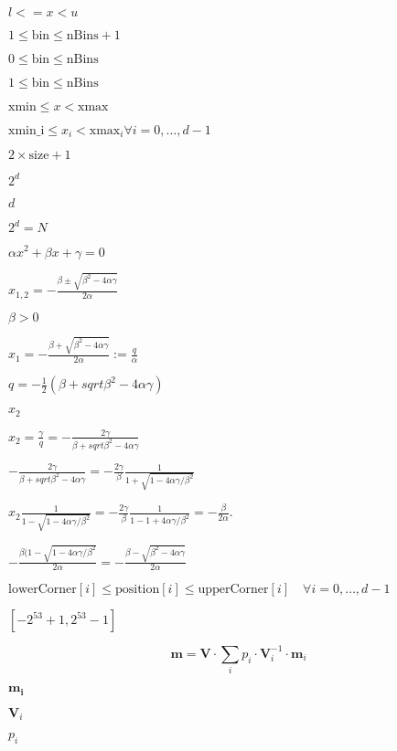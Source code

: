 \documentclass{article}
\begin{document}
$l <= x < u$
\pagebreak

$1 \le \text{bin} \le \text{nBins} + 1$
\pagebreak

$0 \le \text{bin} \le \text{nBins}$
\pagebreak

$1 \le \text{bin} \le \text{nBins}$
\pagebreak

$\text{xmin} \le x < \text{xmax}$
\pagebreak

$\text{xmin_i} \le x_i < \text{xmax}_i \forall i=0, \dots, d-1$
\pagebreak

$2 \times \text{size}+1$
\pagebreak

$2^d$
\pagebreak

$d$
\pagebreak

$2^d = N $
\pagebreak

$ \alpha x^{2} + \beta x + \gamma = 0 $
\pagebreak

$ x_{1, 2} = - \frac{\beta \pm \sqrt{\beta^{2}-4\alpha\gamma}}{2\alpha}$
\pagebreak

$ \beta > 0 $
\pagebreak

$ x_{1} = - \frac{\beta + \sqrt{\beta^{2}-4\alpha\gamma}}{2\alpha} := \frac{q}{\alpha}$
\pagebreak

$ q= -\frac{1}{2}(\beta+sqrt{\beta^{2}-4\alpha\gamma})$
\pagebreak

$ x_{2} $
\pagebreak

$ x_{2} = \frac{\gamma}{q} = -\frac{2\gamma}{\beta+sqrt{\beta^{2}-4\alpha\gamma}}$
\pagebreak

$ -\frac{2\gamma}{\beta+sqrt{\beta^{2}-4\alpha\gamma}} = -\frac{2\gamma}{\beta}\frac{1}{1+\sqrt{1-4\alpha\gamma/\beta^{2}}}$
\pagebreak

$ x_{2}\frac{1}{1-\sqrt{1-4\alpha\gamma/\beta^{2}}} = -\frac{2\gamma}{\beta}\frac{1}{1-1+4\alpha\gamma/\beta^{2}}=-\frac{\beta}{2\alpha}.$
\pagebreak

$ -\frac{\beta(1-\sqrt{1-4\alpha\gamma/\beta^{2}}}{2\alpha} = - \frac{\beta - \sqrt{\beta^{2}-4\alpha\gamma}}{2\alpha} $
\pagebreak

$\text{lowerCorner}[i] \le \text{position}[i] \le \text{upperCorner}[i] \quad \forall i=0, \dots, d-1$
\pagebreak

$[-2^{53}+1, 2^{53}-1]$
\pagebreak

\[ \mathbf{m} = \mathbf{V} \cdot \sum_{i}p_{i}\cdot \mathbf{V}_{i}^{-1}\cdot \mathbf{m}_{i} \]
\pagebreak

$\mathbf{m_{i}}$
\pagebreak

$\mathbf{V}_{i}$
\pagebreak

$p_{i}$
\pagebreak
\end{document}
